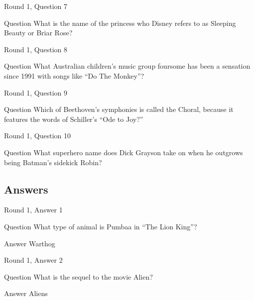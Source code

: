\documentclass[11pt]{beamer}
\begin{document}
\begin{frame}{Round 1, Question 7}
\begin{block}{Question}
What is the name of the princess who Disney refers to as Sleeping Beauty or Briar Rose\@?
\end{block}
\end{frame}
    

\begin{frame}{Round 1, Question 8}
\begin{block}{Question}
What Australian children's music group foursome has been a sensation since 1991 with songs like ``Do The Monkey''\@?
\end{block}
\end{frame}
    

\begin{frame}{Round 1, Question 9}
\begin{block}{Question}
Which of Beethoven's symphonies is called the Choral, because it features the words of Schiller's ``Ode to Joy?''
\end{block}
\end{frame}
    

\begin{frame}{Round 1, Question 10}
\begin{block}{Question}
What superhero name does Dick Grayson take on when he outgrows being Batman's sidekick Robin\@?
\end{block}
\end{frame}
    
\subsection{Answers}

\begin{frame}{Round 1, Answer 1}
\begin{block}{Question}
What type of animal is Pumbaa in ``The Lion King''\@?
\end{block}
\pause{}
\begin{block}{Answer}
Warthog
\end{block}
\end{frame}
    

\begin{frame}{Round 1, Answer 2}
\begin{block}{Question}
What is the sequel to the movie Alien\@?
\end{block}
\pause{}
\begin{block}{Answer}
Aliens
\end{block}
\end{frame}
    
\end{document}
